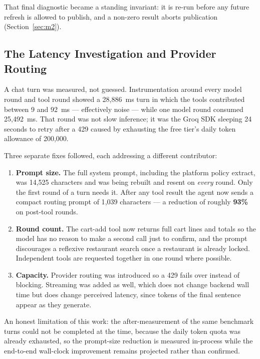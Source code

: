 \documentclass[11pt,a4paper]{article}
\begin{document}
That final diagnostic became a standing invariant: it is re-run before any
future refresh is allowed to publish, and a non-zero result aborts publication
(Section~\ref{sec:m2}).

\subsection{The Latency Investigation and Provider Routing}
\label{sec:latency}

A chat turn was measured, not guessed. Instrumentation around every model
round and tool round showed a 28{,}886~ms turn in which the tools contributed
between 9 and 92~ms --- effectively noise --- while one model round consumed
25{,}492~ms. That round was not slow inference; it was the Groq SDK sleeping
24 seconds to retry after a 429 caused by exhausting the free tier's daily
token allowance of 200{,}000.

Three separate fixes followed, each addressing a different contributor:

\begin{enumerate}[itemsep=3pt,topsep=4pt]
\item \textbf{Prompt size.} The full system prompt, including the platform
      policy extract, was 14{,}525 characters and was being rebuilt and resent
      on \emph{every} round. Only the first round of a turn needs it. After
      any tool result the agent now sends a compact routing prompt of 1{,}039
      characters --- a reduction of roughly \textbf{93\%} on post-tool rounds.
\item \textbf{Round count.} The cart-add tool now returns full cart lines and
      totals so the model has no reason to make a second call just to confirm,
      and the prompt discourages a reflexive restaurant search once a
      restaurant is already locked. Independent tools are requested together
      in one round where possible.
\item \textbf{Capacity.} Provider routing was introduced so a 429 fails over
      instead of blocking. Streaming was added as well, which does not change
      backend wall time but does change perceived latency, since tokens of the
      final sentence appear as they generate.
\end{enumerate}

An honest limitation of this work: the after-measurement of the same benchmark
turns could not be completed at the time, because the daily token quota was
already exhausted, so the prompt-size reduction is measured in-process while
the end-to-end wall-clock improvement remains projected rather than confirmed.
\end{document}
